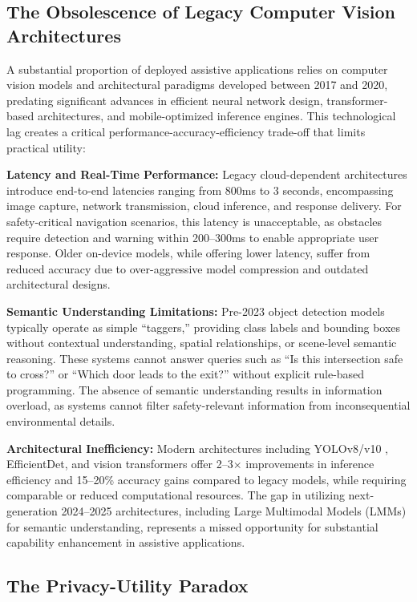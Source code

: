 \documentclass[a4paper]{report}
\begin{document}
\subsection{The Obsolescence of Legacy Computer Vision Architectures}
\label{subsec:legacy-cv-gap}

A substantial proportion of deployed assistive applications relies on computer vision models and architectural paradigms developed between 2017 and 2020, predating significant advances in efficient neural network design, transformer-based architectures, and mobile-optimized inference engines. This technological lag creates a critical performance-accuracy-efficiency trade-off that limits practical utility:

\textbf{Latency and Real-Time Performance:} Legacy cloud-dependent architectures introduce end-to-end latencies ranging from 800ms to 3 seconds, encompassing image capture, network transmission, cloud inference, and response delivery. For safety-critical navigation scenarios, this latency is unacceptable, as obstacles require detection and warning within 200--300ms to enable appropriate user response. Older on-device models, while offering lower latency, suffer from reduced accuracy due to over-aggressive model compression and outdated architectural designs.

\textbf{Semantic Understanding Limitations:} Pre-2023 object detection models typically operate as simple ``taggers,'' providing class labels and bounding boxes without contextual understanding, spatial relationships, or scene-level semantic reasoning. These systems cannot answer queries such as ``Is this intersection safe to cross?'' or ``Which door leads to the exit?'' without explicit rule-based programming. The absence of semantic understanding results in information overload, as systems cannot filter safety-relevant information from inconsequential environmental details.

\textbf{Architectural Inefficiency:} Modern architectures including YOLOv8/v10 \cite{yolov8_ultralytics}, EfficientDet, and vision transformers offer 2--3$\times$ improvements in inference efficiency and 15--20\% accuracy gains compared to legacy models, while requiring comparable or reduced computational resources. The gap in utilizing next-generation 2024--2025 architectures, including Large Multimodal Models (LMMs) \cite{openai_gpt4v} for semantic understanding, represents a missed opportunity for substantial capability enhancement in assistive applications.

\subsection{The Privacy-Utility Paradox}
\label{subsec:privacy-gap}
\end{document}
